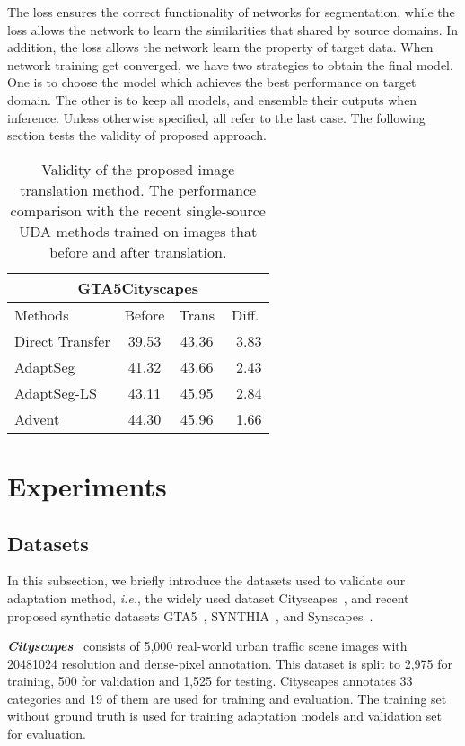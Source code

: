 \documentclass[final]{cvpr}
\def\ie{\textit{i.e.}}
\begin{document}
The loss  ensures the correct functionality of networks for segmentation, while the loss  allows the network to learn the similarities that shared by source domains. In addition, the loss  allows the network learn the property of target data. When network training get converged, we have two strategies to obtain the final model. One is to choose the model which achieves the best performance on target domain. The other is to keep all models, and ensemble their outputs when inference. Unless otherwise specified, all refer to the last case.
The following section tests the validity of proposed approach.

\begin{table}[t]
	\centering
	\caption{Validity of the proposed image translation method. The performance comparison with the recent single-source UDA methods trained on images that before and after translation.}
\label{tab:Lab_ablation}
	\vspace{1mm}
\setlength{\tabcolsep}{3.0mm}
	\begin{tabular}{l|c|c|c}
		\hline
		\multicolumn{4}{c}{GTA5Cityscapes}\\
		\hline
Methods & Before & Trans & Diff. \\
		\hline
		Direct Transfer & 39.53 & 43.36 & ~3.83\\
		AdaptSeg~\cite{tsai2018learning} & 41.32 & 43.66 & ~2.43 \\
		AdaptSeg-LS~\cite{tsai2018learning} & 43.11 & 45.95 & ~2.84 \\
		Advent~\cite{vu2019advent} & 44.30 & 45.96 & ~1.66\\
		\hline
	\end{tabular}
\vspace{-12pt}
\end{table}
\section{Experiments}
\subsection{Datasets}
In this subsection, we briefly introduce the datasets used to validate our adaptation method, \ie, the widely used dataset Cityscapes~\cite{cordts2016cityscapes}, and recent proposed synthetic datasets GTA5~\cite{Richter_2016_ECCV}, SYNTHIA~\cite{Ros_2016_CVPR}, and Synscapes~\cite{wrenninge2018synscapes}.

\textbf{\textit{Cityscapes}}~\cite{cordts2016cityscapes} consists of 5,000 real-world urban traffic scene images with 20481024 resolution and dense-pixel annotation. This dataset is split to 2,975 for training, 500 for validation and 1,525 for testing. Cityscapes annotates 33 categories and 19 of them are used for training and evaluation. The training set without ground truth is used for training adaptation models and validation set for evaluation. 
\end{document}
